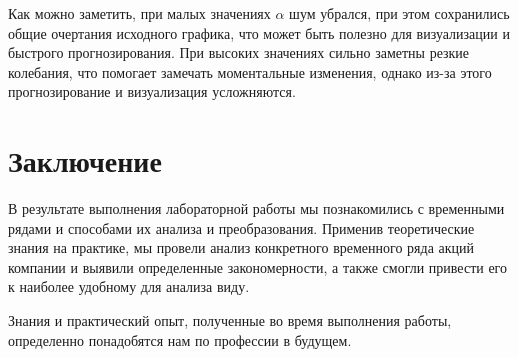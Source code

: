 \documentclass[a4paper, 12pt]{report}
\begin{document}
Как можно заметить, при малых значениях $\alpha$ шум убрался, при этом сохранились общие очертания 
исходного графика, что может быть полезно для визуализации и быстрого прогнозирования. При высоких значениях 
сильно заметны резкие колебания, что помогает замечать моментальные изменения, однако из-за этого прогнозирование 
и визуализация усложняются.

\chapter*{Заключение}
\setcounter{chapter}{3}

В результате выполнения лабораторной работы мы познакомились с временными рядами и способами их анализа и преобразования. 
Применив теоретические знания на практике, мы провели анализ конкретного временного ряда акций компании и выявили 
определенные закономерности, а также смогли привести его к наиболее удобному для анализа виду.
\par
Знания и практический опыт, полученные во время выполнения работы, определенно понадобятся нам по профессии в будущем. 
\end{document}
